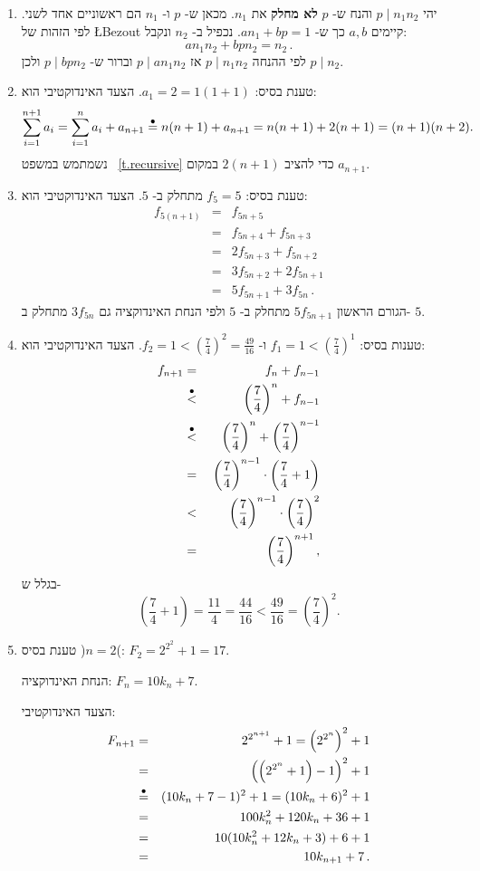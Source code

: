 \begin{enumerate}
\item
יהי
$p \mid n_1n_2$ 
והנח ש-%
$p$
\textbf{לא מחלק}
את
$n_1$.
מכאן ש-%
$p$
ו-%
$n_1$
הם ראשוניים אחד לשני. לפי הזהות של 
\L{Bezout}
קיימים
$a,b$
כך ש-%
$an_1+bp=1$.
נכפיל ב-%
$n_2$
ונקבל:
\[
an_1n_2 + bpn_2 = n_2\,.
\]
לפי ההנחה
$p \mid n_1n_2$
אז
$p \mid an_1n_2$
וברור ש-%
$p \mid bpn_2$
ולכן
$p\mid n_2$.

\item
טענת בסיס:
$a_1=2=1(1+1)$.
הצעד האינדוקטיבי הוא:
\[
\sum_{i=1}^{n+1}a_i=\sum_{i=1}^n a_i+a_{n+1}\stackrel{\bullet}{=}{}n(n+1)+a_{n+1}=n(n+1)+2(n+1)=(n+1)(n+2).
\]
נשמתמש במשפט~%
\ref{t.recursive}
כדי להציב
$2(n+1)$
במקום
$a_{n+1}$.

\item 
טענת בסיס:
$f_5=5$ 
מתחלק ב-%
$5$.
הצעד האינדוקטיבי הוא:
\begin{eqnarray*}
f_{5(n+1)} &=& f_{5n+5}\\
&=& f_{5n+4}+f_{5n+3}\\
&=& 2f_{5n+3}+f_{5n+2}\\
&=& 3f_{5n+2}+2f_{5n+1}\\
&=& 5f_{5n+1}+3f_{5n}\,.
\end{eqnarray*}
הגורם הראשון 
$5f_{5n+1}$
מתחלק ב-%
$5$
ולפי הנחת האינדוקציה
גם
$3f_{5n}$
מתחלק ב-%
$5$.

\item 
טענות בסיס:
$f_1=1<(\frac{7}{4})^1$
ו-%
$f_2=1<(\frac{7}{4})^2=\frac{49}{16}$.
הצעד האינדוקטיבי הוא:
\begin{eqnarray*}
f_{n+1}&=&f_n+f_{n-1}\\
&\stackrel{\bullet}{<}{}&\left(\frac{7}{4}\right)^n + f_{n-1}\\
&\stackrel{\bullet}{<}{}&\left(\frac{7}{4}\right)^n + \left(\frac{7}{4}\right)^{n-1}\\
&=&\left(\frac{7}{4}\right)^{n-1}\cdot\left(\frac{7}{4}+1\right)\\
&<&\left(\frac{7}{4}\right)^{n-1}\cdot\left(\frac{7}{4}\right)^2\\
&=&\left(\frac{7}{4}\right)^{n+1},
\end{eqnarray*}
בגלל ש-%
\[
\left(\frac{7}{4}+1\right) = \frac{11}{4} = \frac{44}{16}<\frac{49}{16}=\left(\frac{7}{4}\right)^2.
\]

\item
טענת בסיס
)$n=2$(: $F_2=2^{2^2}+1=17$.

הנחת האינדוקציה:
$F_n=10k_n+7$.

הצעד האינדוקטיבי:
\begin{eqnarray*}
F_{n+1}&=&2^{2^{n+1}}+1=\left(2^{2^{n}}\right)^2+1\\
&=&\left(\left(2^{2^{n}}+1\right)-1\right)^2+1\\
&\stackrel{\bullet}{=}&(10k_n+7-1)^2+1=(10k_n+6)^2+1\\
&=&100k_n^2+120k_n+36+1\\
&=&10(10k_n^2+12k_n+3)+6+1\\
&=&10k_{n+1}+7\,.
\end{eqnarray*}


\end{enumerate}
